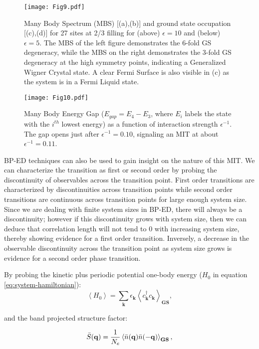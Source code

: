 \documentclass[
 reprint,
 amsmath,amssymb,
 aps, prx,
floatfix,longbibliography,
]{revtex4-2}
\begin{document}
\begin{appendix}
\begin{figure}
    \centering
    \texttt{[image: Fig9.pdf]}
    \caption{Many Body Spectrum (MBS) [(a),(b)] and ground state occupation [(c),(d)] for 27 sites at 2/3 filling for (above) $\epsilon=10$ and (below) $\epsilon=5$. The MBS of the left figure demonstrates the 6-fold GS degeneracy, while the MBS on the right demonstrates the 3-fold GS degeneracy at the high symmetry points, indicating a Generalized Wigner Crystal state. A clear Fermi Surface is also visible in (c) as the system is in a Fermi Liquid state.
    }
    \label{fig:9}
\end{figure}

\begin{figure}
    \centering
    \texttt{[image: Fig10.pdf]}
    \caption{Many Body Energy Gap ($E_{gap}=E_4-E_3$, where $E_i$ labels the state with the $i^{th}$ lowest energy) as a function of interaction strength $\epsilon^{-1}$. The gap opens just after $\epsilon^{-1}=0.10$, signaling an MIT at about $\epsilon^{-1}=0.11$.
    }
    \label{fig:10}
\end{figure}

BP-ED techniques can also be used to gain insight on the nature of this MIT. We can characterize the transition as first or second order by probing the discontinuity of observables across the transition point. First order transitions are characterized by discontinuities across transition points while second order transitions are continuous across transition points for large enough system size. Since we are dealing with finite system sizes in BP-ED, there will always be a discontinuity; however if this discontinuity grows with system size, then we can deduce that correlation length will not tend to 0 with increasing system size, thereby showing evidence for a first order transition. Inversely, a decrease in the observable discontinuity across the transition point as system size grows is evidence for a second order phase transition. 

By probing the kinetic plus periodic potential one-body energy ($H_0$ in equation \ref{eq:system-hamiltonian}):
\begin{equation}
    \left\langle H_0 \right\rangle = \sum_{\mathbf{k}}\epsilon_{\mathbf{k}}\left\langle c_{\mathbf{k}}^\dagger c_{\mathbf{k}} \right\rangle_{\mathbf{GS}},
\end{equation}

and the band projected structure factor: 

\begin{equation}
    \Bar{S}(\mathbf{q})=\frac{1}{N_e}\left\langle \Bar{n}(\mathbf{q})\Bar{n}(\mathbf{-q})\right\rangle_{\mathbf{GS}},
\end{equation}


\end{appendix}
\end{document}
